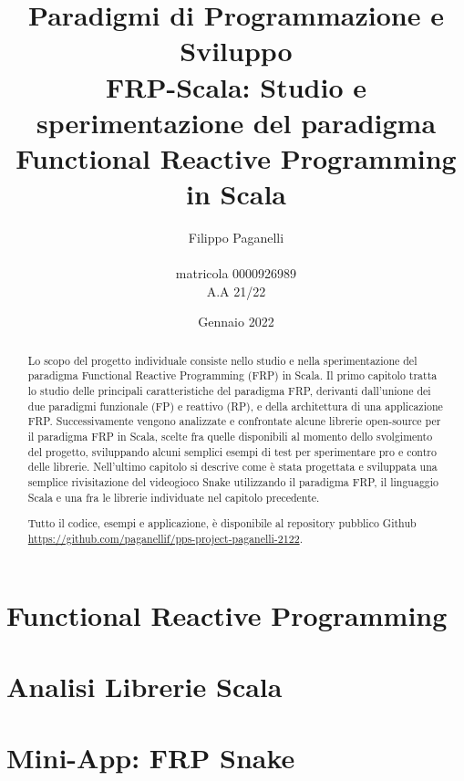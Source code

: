 \documentclass{report}
\title{\LARGE \textbf{Paradigmi di Programmazione e Sviluppo} \\ FRP-Scala: Studio e sperimentazione del paradigma Functional Reactive Programming in Scala
}
\author{
    Filippo Paganelli \\ \emailaddr{filippo.paganelli3@studio.unibo.it}
    \\ matricola 0000926989 \\ A.A 21/22
}
\date{Gennaio 2022}
\begin{document}
\maketitle
\newpage
\begin{abstract}
Lo scopo del progetto individuale consiste nello studio e nella sperimentazione del paradigma Functional Reactive Programming (FRP) in Scala. Il primo capitolo tratta lo studio delle principali caratteristiche del paradigma FRP, derivanti dall'unione dei due paradigmi funzionale (FP) e reattivo (RP), e della architettura di una applicazione FRP. Successivamente vengono analizzate e confrontate alcune librerie open-source per il paradigma FRP in Scala, scelte fra quelle disponibili al momento dello svolgimento del progetto, sviluppando alcuni semplici esempi di test per sperimentare pro e contro delle librerie. Nell'ultimo capitolo si descrive come è stata progettata e sviluppata una semplice rivisitazione del videogioco Snake utilizzando il paradigma FRP, il linguaggio Scala e una fra le librerie individuate nel capitolo precedente.

Tutto il codice, esempi e applicazione, è disponibile al repository pubblico Github \url{https://github.com/paganellif/pps-project-paganelli-2122}.
\end{abstract}
\newpage
\tableofcontents

%

\newpage
\chapter{Functional Reactive Programming}\label{frp}


\newpage
\chapter{Analisi Librerie Scala}\label{analisi}


\newpage
\chapter{Mini-App: FRP Snake}\label{mini-app}

\end{document}
